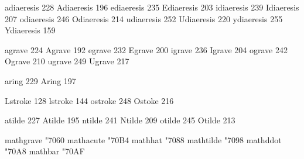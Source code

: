  adiaeresis       228
 Adiaeresis       196
 ediaeresis       235
 Ediaeresis       203
 idiaeresis       239
 Idiaeresis       207
 odiaeresis       246
 Odiaeresis       214
 udiaeresis       252
 Udiaeresis       220
 ydiaeresis       255
 Ydiaeresis       159

 agrave           224
 Agrave           192
 egrave           232
 Egrave           200
 igrave           236
 Igrave           204
 ograve           242
 Ograve           210
 ugrave           249
 Ugrave           217

 aring            229
 Aring            197

 Lstroke          128
 lstroke          144
 ostroke          248
 Ostoke           216

 atilde           227
 Atilde           195
 ntilde           241
 Ntilde           209
 otilde           245
 Otilde           213

\stopencoding


\startencoding[texnansi]

 mathgrave       "7060
 mathacute       "70B4
 mathhat         "7088
 mathtilde       "7098
 mathddot        "70A8
 mathbar         "70AF

\stopencoding

\endinput
